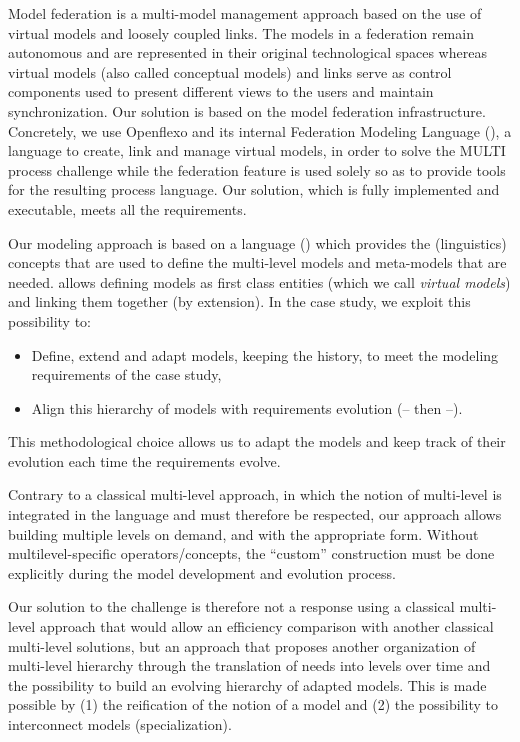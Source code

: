 Model federation is a multi-model management approach based on the use of
virtual models and loosely coupled links. The models in a federation remain
autonomous and are represented in their original technological spaces whereas
virtual models (also called conceptual models) and links serve as control
components used to present different views to the users and maintain
synchronization. Our solution is based on the model federation infrastructure.
Concretely, we use Openflexo and its internal Federation Modeling Language
(\FML), a language to create, link and manage virtual models, in order to solve
the MULTI process challenge while the federation feature is used solely so as
to provide tools for the resulting process language. Our solution, which is
fully implemented and executable, meets all the requirements.

Our modeling approach is based on a language (\FML) which provides the
(linguistics) concepts that are used to define the multi-level models and
meta-models that are needed. \FML allows defining models as first class
entities (which we call \emph{virtual models}) and linking them together (by
extension). In the \mpc case study, we exploit this possibility to:
\begin{itemize}
    \item Define, extend and adapt models, keeping the history, to meet the %
    modeling requirements of the case study,
    \item Align this hierarchy of models with requirements evolution
      (-- then --).
\end{itemize}
This methodological choice allows us to adapt the models and keep track of their evolution each time the requirements evolve.

Contrary to a classical multi-level approach, in which the notion of
multi-level is integrated in the language and must therefore be respected, our
approach allows building multiple levels on demand, and with the appropriate form.
Without multilevel-specific operators/concepts, the \enquote{custom}
construction must be done explicitly during the model development and evolution
process.

Our solution to the challenge is therefore not a response using a classical multi-level approach that would allow an efficiency comparison with another classical multi-level solutions, but an approach that proposes another organization of multi-level hierarchy through the translation of needs into levels over time and the possibility to build an evolving hierarchy of adapted models. This is made possible by (1) the reification of the notion of a model and (2) the possibility to interconnect models (specialization).%

